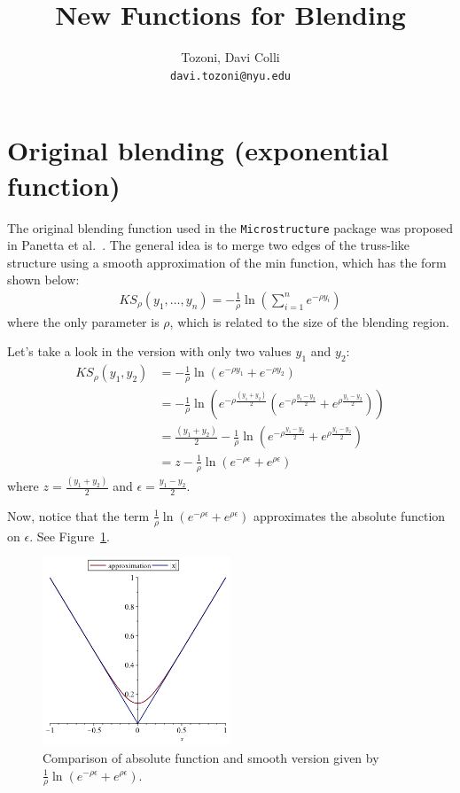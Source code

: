 \documentclass[11pt]{article}
\author{
  Tozoni, Davi Colli\\
  \texttt{davi.tozoni@nyu.edu}
}
\title{New Functions for Blending}
\begin{document}
\maketitle

\section{Original blending (exponential function)}
The original blending function used in the \texttt{Microstructure} package was proposed in Panetta et al.~\cite{Panetta2017}. The general idea is to merge two edges of the truss-like structure using a smooth approximation of the min function, which has the form shown below:
\begin{align}
  KS_\rho(y_1, \dots, y_n) = - \frac1\rho \ln\left(\sum_{i=1}^{n} e^{-\rho y_i} \right)
\end{align}
where the only parameter is $\rho$, which is related to the size of the blending region.

Let's take a look in the version with only two values $y_1$ and $y_2$:
\begin{align*}
  KS_\rho(y_1, y_2) &= - \frac1\rho \ln\left(e^{-\rho y_1} + e^{-\rho y_2} \right)\\
  &= - \frac1\rho \ln\left(e^{-\rho \frac{(y_1+y_2)}{2}} \left(e^{-\rho \frac{y_1 - y_2}{2}} + e^{\rho \frac{y_1-y_2}{2}} \right)\right)\\
  &= \frac{(y_1+y_2)}{2} - \frac 1\rho \ln\left(e^{-\rho \frac{y_1 - y_2}{2}} + e^{\rho \frac{y_1-y_2}{2}} \right)\\
  &= z - \frac 1\rho \ln\left(e^{-\rho \epsilon} + e^{\rho \epsilon} \right)
\end{align*}
where $z=\frac{(y_1+y_2)}{2}$ and $\epsilon=\frac{y_1 - y_2}{2}$.

Now, notice that the term $\frac 1\rho \ln\left(e^{-\rho \epsilon} + e^{\rho \epsilon} \right)$ approximates the absolute function on $\epsilon$. See Figure~\ref{fig:absolute_function}.
  \begin{figure}[!hbt]
    \begin{center}
      \includegraphics[width=0.5\textwidth]{absolute_function}
    \end{center}
    \caption{Comparison of absolute function and smooth version given by $\frac 1\rho \ln\left(e^{-\rho \epsilon} + e^{\rho \epsilon} \right)$.}
    \label{fig:absolute_function}
  \end{figure}
\end{document}
